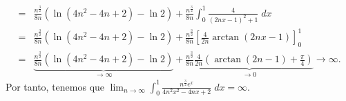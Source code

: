 \documentclass{article}
\begin{document}
\begin{sol}
\[\begin{split}
	= & \frac{ n^{\frac{3}{2}} }{8n}\left(\ln\left(4n^{2}-4n+2\right)-\ln 2\right) + \frac{ n^{\frac{3}{2}} }{8n}\int^{1}_{0} \frac{4}{\left(2nx-1\right)^{2}+1} \; dx\\
	= & \frac{ n^{\frac{3}{2}} }{8n}\left(\ln\left(4n^{2}-4n+2\right)-\ln 2\right) + \frac{ n^{\frac{3}{2}} }{8n}\left[\frac{4}{2n}\arctan\left(2nx-1\right)\right] ^{1}_{0} \\
	= & \underbrace{\frac{ n^{\frac{3}{2}} }{8n}\left(\ln\left(4n^{2}-4n+2\right)-\ln 2\right)}_{\to \infty} + \underbrace{\frac{ n^{\frac{3}{2}} }{8n}\frac{4}{2n}\left(\arctan\left(2n-1\right)+\frac{\pi }{4}\right)}_{\to 0} \to \infty.
\end{split}
\]
Por tanto, tenemos que $\displaystyle \lim_{n \to \infty}\int^{1}_{0} \frac{n^{\frac{3}{2}}e^{x}}{4n^{2}x^{2}-4nx+2} \; dx = \infty$.
\end{sol}
\end{document}
